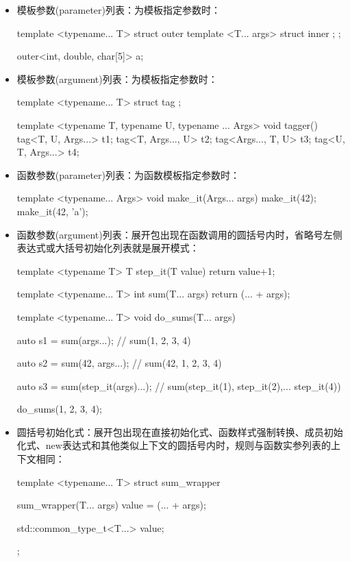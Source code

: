\begin{itemize}
  \item 模板参数(parameter)列表：为模板指定参数时：

\begin{cpp}
template <typename... T>
struct outer
{
	template <T... args>
	struct inner {};
};

outer<int, double, char[5]> a;
\end{cpp}
  \item 模板参数(argument)列表：为模板指定参数时：

\begin{cpp}
template <typename... T>
struct tag {};

template <typename T, typename U, typename ... Args>
void tagger()
{
	tag<T, U, Args...> t1;
	tag<T, Args..., U> t2;
	tag<Args..., T, U> t3;
	tag<U, T, Args...> t4;
}
\end{cpp}
  \item 函数参数(parameter)列表：为函数模板指定参数时：

\begin{cpp}
template <typename... Args>
void make_it(Args... args)
{ }
make_it(42);
make_it(42, 'a');
\end{cpp}
  \item 函数参数(argument)列表：展开包出现在函数调用的圆括号内时，省略号左侧表达式或大括号初始化列表就是展开模式：

\begin{cpp}
template <typename T>
T step_it(T value)
{
	return value+1;
}

template <typename... T>
int sum(T... args)
{
	return (... + args);
}

template <typename... T>
void do_sums(T... args)
{
	auto s1 = sum(args...);
	// sum(1, 2, 3, 4)
	
	auto s2 = sum(42, args...);
	// sum(42, 1, 2, 3, 4)
	
	auto s3 = sum(step_it(args)...);
	// sum(step_it(1), step_it(2),... step_it(4))
}

do_sums(1, 2, 3, 4);
\end{cpp}
  \item 圆括号初始化式：展开包出现在直接初始化式、函数样式强制转换、成员初始化式、new表达式和其他类似上下文的圆括号内时，规则与函数实参列表的上下文相同：

\begin{cpp}
template <typename... T>
struct sum_wrapper
{
	sum_wrapper(T... args)
	{
		value = (... + args);
	}

	std::common_type_t<T...> value;
};


\end{cpp}
\end{itemize}
